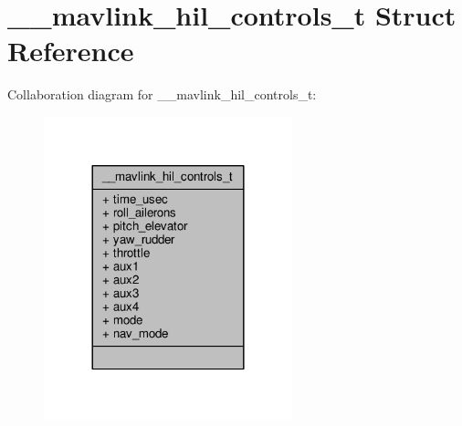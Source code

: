 \hypertarget{struct____mavlink__hil__controls__t}{\section{\+\_\+\+\_\+mavlink\+\_\+hil\+\_\+controls\+\_\+t Struct Reference}
\label{struct____mavlink__hil__controls__t}
}


Collaboration diagram for \+\_\+\+\_\+mavlink\+\_\+hil\+\_\+controls\+\_\+t\+:
\nopagebreak
\begin{figure}[H]
\begin{center}
\leavevmode
\includegraphics[width=204pt]{struct____mavlink__hil__controls__t__coll__graph}
\end{center}
\end{figure}
